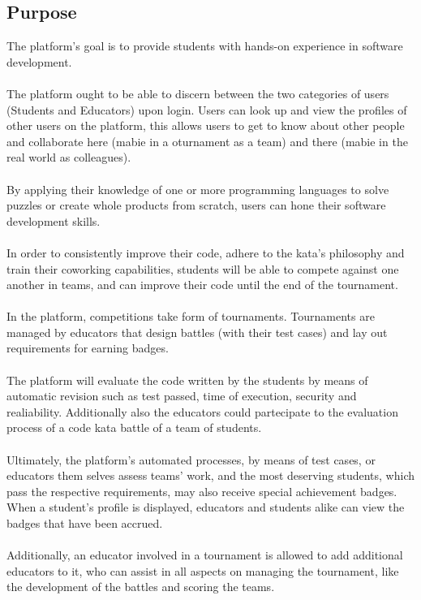 \subsection{Purpose}
The platform's goal is to provide students with hands-on experience in software development.
\\
\\
The platform ought to be able to discern between the two categories of users (Students and Educators) upon login.
Users can look up and view the profiles of other users on the platform, this allows users to get to know about other people and collaborate here (mabie in a oturnament as a team) and there (mabie in the real world as colleagues).
\\ \\
By applying their knowledge of one or more programming languages to solve puzzles or create whole products from scratch, users can hone their software development skills. 
\\ \\
In order to consistently improve their code, adhere to the kata's philosophy and train their coworking capabilities, students will be able to compete against one another in teams, and can improve their code until the end of the tournament.
\\ \\
In the platform, competitions take form of tournaments. Tournaments are managed by educators that design battles (with their test cases) and lay out requirements for earning badges.
\\ \\
The platform will evaluate the code written by the students by means of automatic revision such as test passed, time of execution, security and realiability. Additionally also the educators could partecipate to the evaluation process of a code kata battle of a team of students.
\\ \\
Ultimately, the platform's automated processes, by means of test cases, or educators them selves assess teams' work, and the most deserving students, which pass the respective requirements, may also receive special achievement badges.\\ When a student's profile is displayed, educators and students alike can view the badges that have been accrued.
\\ \\
Additionally, an educator involved in a tournament is allowed to add additional educators to it, who can assist in all aspects on managing the tournament, like the development of the battles and scoring the teams.

